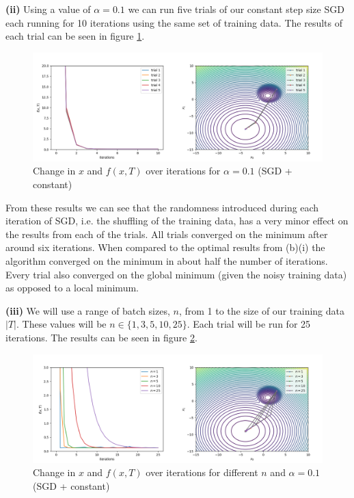 \documentclass[12pt]{article}
\begin{document}
\vspace{3mm}
\noindent \textbf{(ii)} Using a value of $\alpha = 0.1$ we can run five trials of our constant step size SGD each running for 10 iterations using the same set of training data. The results of each trial can be seen in figure \ref{fig:b_ii}.

\begin{figure}[h]
    \hspace*{-0.45in}
    \includegraphics[scale=1.75]{figs/b/b_ii.png}
    \caption{Change in $x$ and $f(x, T)$ over iterations for $\alpha = 0.1$ (SGD + constant)}
    \label{fig:b_ii}
\end{figure}

From these results we can see that the randomness introduced during each iteration of SGD, i.e. the shuffling of the training data, has a very minor effect on the results from each of the trials. All trials converged on the minimum after around six iterations. When compared to the optimal results from (b)(i) the algorithm converged on the minimum in about half the number of iterations. Every trial also converged on the global minimum (given the noisy training data) as opposed to a local minimum.

\vspace{3mm}
\noindent \textbf{(iii)} We will use a range of batch sizes, $n$, from 1 to the size of our training data $|T|$. These values will be $n \in \{1, 3, 5, 10, 25\}$. Each trial will be run for 25 iterations. The results can be seen in figure \ref{fig:b_iii}.

\begin{figure}[h]
    \hspace*{-0.45in}
    \includegraphics[scale=1.75]{figs/b/b_iii.png}
    \caption{Change in $x$ and $f(x, T)$ over iterations for different $n$ and $\alpha = 0.1$ (SGD + constant)}
    \label{fig:b_iii}
\end{figure}
\end{document}
